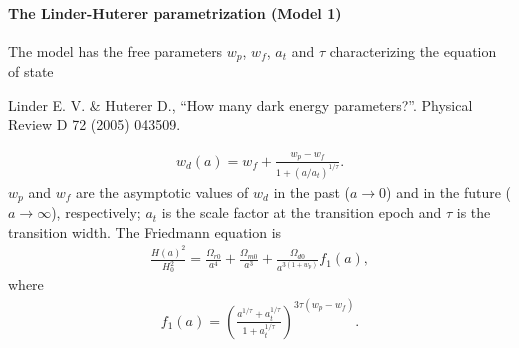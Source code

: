 \documentclass[letterpaper,12pt,english]{sphinxhowto}
\begin{document}
\paragraph{The Linder-Huterer parametrization (Model 1)}
\label{\detokenize{themodels:the-linder-huterer-parametrization-model-1}}
The model  has the free parameters
\(w_p\),
\(w_f\),
\(a_t\) and
\(\tau\) characterizing the equation of state %
\begin{footnote}[8]\sphinxAtStartFootnote
Linder E. V. \& Huterer D., “How many dark energy parameters?”. Physical Review D 72 (2005) 043509.
%
\end{footnote}
\begin{equation*}
\begin{split}w_d(a) = w_f + \frac{w_p - w_f}{1 + (a/a_t)^{1/\tau}}.\end{split}
\end{equation*}
\(w_p\) and \(w_f\) are the asymptotic values of \(w_d\) in the
past (\(a \to 0\)) and in the future (\(a \to \infty\)), respectively;
\(a_t\) is the scale factor at the transition epoch and \(\tau\) is the
transition width.
The Friedmann equation is
\begin{equation*}
\begin{split}\frac{H(a)^2}{H_0^2} = \frac{\Omega_{r0}}{a^4} + \frac{\Omega_{m0}}{a^3} + \frac{\Omega_{d0}}{a^{3(1+w_p)}} f_1(a),\end{split}
\end{equation*}
where
\begin{equation*}
\begin{split}f_1(a) = \left( \frac{a^{1/\tau} + a_t^{1/\tau}}{1 + a_t^{1/\tau}} \right)^{3\tau(w_p - w_f)}.\end{split}
\end{equation*}
\end{document}
